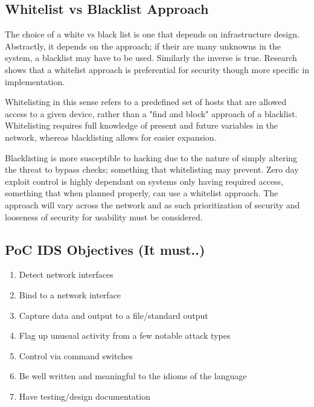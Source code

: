 
\subsection{Whitelist vs Blacklist Approach}
The choice of a white vs black list is one that depends on infrastructure design. Abstractly, it depends on the approach; if their are many unknowns in the system, a blacklist may have to be used. 
Similarly the inverse is true. Research shows that a whitelist approach is preferential for security though more specific in implementation. 

Whitelisting in this sense refers to a predefined set of hosts
that are allowed access to a given device, rather than a "find and block" approach of a blacklist. Whitelisting requires full knowledge of present and future variables in the network, whereas blacklisting
allows for easier expansion. 

Blacklisting is more susceptible to hacking due to the nature of simply altering the threat to bypass checks; something that whitelisting may prevent. Zero day exploit control is 
highly dependant on systems only having required access, something that when planned properly, can use a whitelist approach. The approach will vary across the network and as such prioritization of security 
and looseness of security for usability must be considered.


\subsection{PoC IDS Objectives (It must..)}
\begin{enumerate}
	\item Detect network interfaces
	\item Bind to a network interface
	\item Capture data and output to a file/standard output
	\item Flag up unusual activity from a few notable attack types
	\item Control via command switches
	\item Be well written and meaningful to the idioms of the language
	\item Have testing/design documentation
\end{enumerate}


